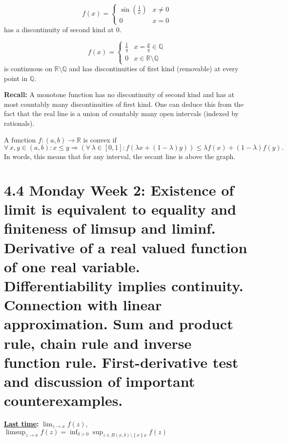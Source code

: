 \documentclass{notes}
\begin{document}
  \begin{eg}
    \begin{equation}
      f(x) = \begin{cases}
        \sin \left ( \frac{1}{x} \right ) & x \neq 0 \\ 
        0 & x = 0
      \end{cases}
    \end{equation}
    has a discontinuity of second kind at 0.
  \end{eg}
  
  \begin{eg}
    \begin{equation}
      f(x) = \begin{cases}
        \frac{1}{q} & x = \frac{p}{q} \in \mathbb Q \\ 
        0 & x \in \mathbb R \setminus \mathbb Q
      \end{cases}
    \end{equation}
    is continuous on $\mathbb R \setminus \mathbb Q$ and has discontinuities of first kind (removable) at every point in $\mathbb Q$.
  \end{eg}
  
  {\boldmath \bfseries Recall:} A monotone function has no discontinuity of second kind and has at most countably many discontinuities of first kind.
  One can deduce this from the fact that the real line is a union of countably many open intervals (indexed by rationals).
  
  \begin{defn}
    A function $f \colon (a, b) \to \mathbb R$ is convex if 
    \[
      \forall \, x, y \in (a, b): x \leq y \Rightarrow (\forall \, \lambda \in [0, 1]: f(\lambda x + (1 - \lambda) y)) \leq \lambda f(x) + (1 - \lambda) f(y).
    \]
    In words, this means that for any interval, the secant line is above the graph.
  \end{defn}
  
  \section{4.4 Monday Week 2: Existence of limit is equivalent to equality and finiteness of limsup and liminf. Derivative of a real valued function of one real variable. Differentiability implies continuity. Connection with linear approximation. Sum and product rule, chain rule and inverse function rule. First-derivative test and discussion of important counterexamples.}
  
  {\boldmath \bfseries \underline{Last time}:} $\lim_{z \to x} f(z)$, $\limsup_{z \to x} f(z) = \inf_{\delta > 0} \sup_{z \in B(x, \delta) \setminus \left \{ x \right \}x} f(z)$
  
\end{document}
